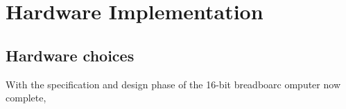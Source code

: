 \chapter{Hardware Implementation}

\section{Hardware choices}
With the specification and design phase of the 16-bit breadboarc omputer now complete,

